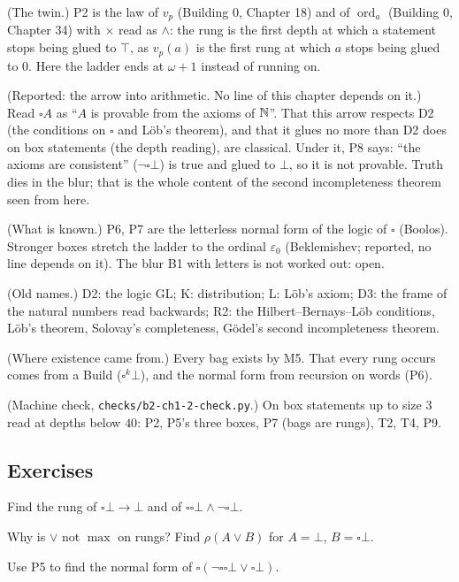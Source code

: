 \begin{lines}
\item[\lab{R1}] (The twin.) P2 is the law of $v_p$ (Building 0, Chapter 18) and of $\operatorname{ord}_a$ (Building 0, Chapter 34) with $\times$ read as $\wedge$: the rung is the first depth at which a statement stops being glued to $\top$, as $v_p(a)$ is the first rung at which $a$ stops being glued to $0$. Here the ladder ends at $\omega + 1$ instead of running on.
\item[\lab{R2}] (Reported: the arrow into arithmetic. No line of this chapter depends on it.) Read $\square A$ as ``$A$ is provable from the axioms of $\mathbb{N}$''. That this arrow respects D2 (the conditions on $\square$ and L\"ob's theorem), and that it glues no more than D2 does on box statements (the depth reading), are classical. Under it, P8 says: ``the axioms are consistent'' ($\neg\square\bot$) is true and glued to $\bot$, so it is not provable. Truth dies in the blur; that is the whole content of the second incompleteness theorem seen from here.
\item[\lab{R3}] (What is known.) P6, P7 are the letterless normal form of the logic of $\square$ (Boolos). Stronger boxes stretch the ladder to the ordinal $\varepsilon_0$ (Beklemishev; reported, no line depends on it). The blur B1 with letters is not worked out: open.
\item[\lab{R4}] (Old names.) D2: the logic GL; K: distribution; L: L\"ob's axiom; D3: the frame of the natural numbers read backwards; R2: the Hilbert--Bernays--L\"ob conditions, L\"ob's theorem, Solovay's completeness, G\"odel's second incompleteness theorem.
\item[\lab{R5}] (Where existence came from.) Every bag exists by M5. That every rung occurs comes from a Build ($\square^k\bot$), and the normal form from recursion on words (P6).
\item[\lab{R6}] (Machine check, \texttt{checks/b2-ch1-2-check.py}.) On box statements up to size $3$ read at depths below $40$: P2, P5's three boxes, P7 (bags are rungs), T2, T4, P9.
\end{lines}

\subsection*{Exercises}

\begin{lines}
\item[\lab{E1}] Find the rung of $\square\bot \to \bot$ and of $\square\square\bot \wedge \neg\square\bot$.
\item[\lab{E2}] Why is $\vee$ not $\max$ on rungs? Find $\rho(A \vee B)$ for $A = \bot$, $B = \square\bot$.
\item[\lab{E3}] Use P5 to find the normal form of $\square(\neg\square\square\bot \vee \square\bot)$.
\end{lines}
